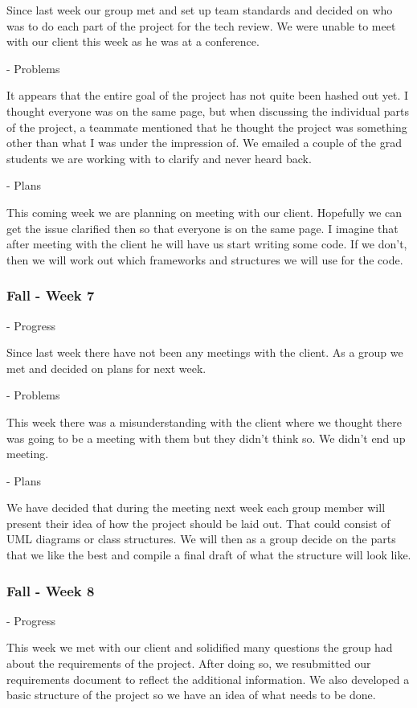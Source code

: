 \documentclass[onecolumn, draftclsnofoot,10pt, compsoc]{IEEEtran}
\begin{document}
Since last week our group met and set up team standards and decided on who was to do each part of the project for the tech review.
We were unable to meet with our client this week as he was at a conference.

- Problems

It appears that the entire goal of the project has not quite been hashed out yet.
I thought everyone was on the same page, but when discussing the individual parts of the project, a teammate mentioned that he thought the project was something other than what I was under the impression of.
We emailed a couple of the grad students we are working with to clarify and never heard back.

- Plans

This coming week we are planning on meeting with our client.
Hopefully we can get the issue clarified then so that everyone is on the same page.
I imagine that after meeting with the client he will have us start writing some code.
If we don't, then we will work out which frameworks and structures we will use for the code.
\subsubsection{Fall - Week 7}
- Progress

Since last week there have not been any meetings with the client.
As a group we met and decided on plans for next week.

- Problems

This week there was a misunderstanding with the client where we thought there was going to be a meeting with them but they didn't think so.
We didn't end up meeting.

- Plans

We have decided that during the meeting next week each group member will present their idea of how the project should be laid out.
That could consist of UML diagrams or class structures.
We will then as a group decide on the parts that we like the best and compile a final draft of what the structure will look like.
\subsubsection{Fall - Week 8}
- Progress

This week we met with our client and solidified many questions the group had about the requirements of the project.
After doing so, we resubmitted our requirements document to reflect the additional information.
We also developed a basic structure of the project so we have an idea of what needs to be done.
\end{document}
